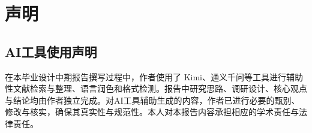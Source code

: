 \cleardoublepage

\newrefsection

\chapter{声明}

\section{AI工具使用声明}

\par 在本毕业设计中期报告撰写过程中，作者使用了 Kimi、通义千问等工具进行辅助性文献检索与整理、语言润色和格式检测。报告中研究思路、调研设计、核心观点与结论均由作者独立完成。对AI工具辅助生成的内容，作者已进行必要的甄别、修改与核实，确保其真实性与规范性。本人对本报告内容承担相应的学术责任与法律责任。